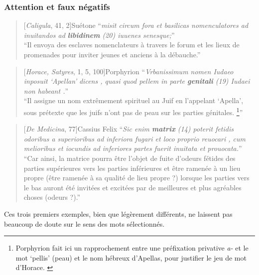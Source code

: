\subsubsection{Attention et faux négatifs}

\begin{quote}[\textit{Caligula}, 41, 2]{Suétone}
    \enquote{\textit{misit circum fora et basilicas nomenculatores ad inuitandos ad \textbf{libidinem} (20) iuuenes senesque;}} \\
    \enquote{Il envoya des esclaves nomenclateurs à travers le forum et les lieux de promenades pour inviter jeunes et anciens à la débauche.}
\end{quote}

\begin{quote}[\textit{Horace, Satyres}, 1, 5, 100]{Porphyrion}
    \enquote{\textit{Vrbanissimum nomen Iudaeo inposuit ‘Apellan’ dicens , quasi quod pellem in parte \textbf{genitali} (19) Iudaei non habeant .}} \\
    \enquote{Il assigne un nom extrêmement spirituel au Juif en l'appelant ‘Apella’, sous prétexte que les juifs n'ont pas de peau sur les parties génitales. \footnote{Porphyrion fait ici un rapprochement entre une préfixation privative \textit{a-} et le mot \enquote{pellis} (peau) et le nom hébreux d'Apellas, pour justifier le jeu de mot d'Horace. \textcite{cordier2001romains}}}
\end{quote}

\begin{quote}[\textit{De Medicina}, 77]{Cassius Felix}
    \enquote{\textit{Sic enim \textbf{matrix} (14) poterit fetidis odoribus a superioribus ad inferiora fugari et loco proprio reuocari , cum melioribus et iocundis ad inferiores partes fuerit inuitata et prouocata.}} \\
    \enquote{Car ainsi, la matrice pourra être l'objet de fuite d'odeurs fétides des parties supérieures vers les parties inférieures et être ramenée à un lieu propre (être ramenée à sa qualité de lieu propre ?) lorsque les parties vers le bas auront été invitées et excitées par de meilleures et plus agréables choses (odeurs ?).}
\end{quote}

Ces trois premiers exemples, bien que légèrement différents, ne laissent pas beaucoup de doute sur le sens des mots sélectionnés. 

